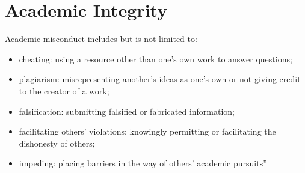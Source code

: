 \documentclass{tufte-handout}
\begin{document}
\section{Academic Integrity}





Academic misconduct includes but is not limited to:

\begin{itemize}
	\item cheating: using a resource other than one's own work to answer questions;
	\item plagiarism: misrepresenting another's ideas as one's own or not giving credit to the creator of a work;
	\item falsification: submitting falsified or fabricated information;
	\item facilitating others' violations: knowingly permitting or facilitating the dishonesty of others;
	\item impeding: placing barriers in the way of others' academic pursuits''
\end{itemize}
\end{document}
